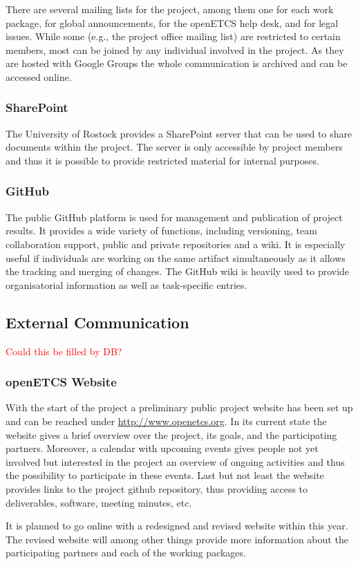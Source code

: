 There are several mailing lists for the project, among them one for each work package, for global announcements, for the openETCS help desk, and for legal issues. While some (e.g., the project office mailing list) are restricted to certain members, most can be joined by any individual involved in the project. As they are hosted with Google Groups the whole communication is archived and can be accessed online.

\subsubsection{SharePoint}

The University of Rostock provides a SharePoint server that can be used to share documents within the project. The server is only accessible by project members and thus it is possible to provide restricted material for internal purposes.

\subsubsection{GitHub}

The public GitHub platform is used for management and publication of project results. It provides a wide variety of functions, including versioning, team collaboration support, public and private repositories and a wiki. It is especially useful if individuals are working on the same artifact simultaneously as it allows the tracking and merging of changes. The GitHub wiki is heavily used to provide organisatorial information as well as task-specific entries.

\subsection{External Communication}
\textcolor{red}{Could this be filled by DB?}

\subsubsection{openETCS Website}
With the start of the project a preliminary public project website has been set up and can be reached under \url{http://www.openetcs.org}. In its current state the website gives a brief overview over the project, its goals, and the participating partners. Moreover, a calendar with upcoming events gives people not yet involved but interested in the project an overview of ongoing activities and thus the possibility to participate in these events. Last but not least the website provides links to the project github repository, thus providing access to deliverables, software, meeting minutes, etc.

It is planned to go online with a redesigned and revised website within this year. The revised website will among other things provide more information about the participating partners and each of the working packages.
